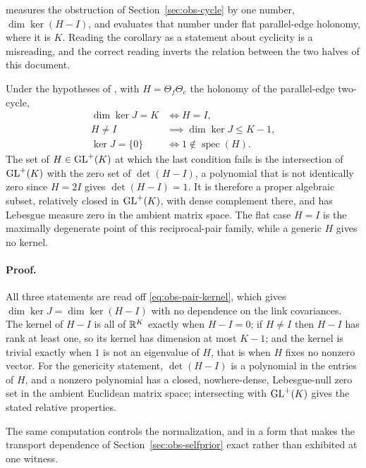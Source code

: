  measures the obstruction of Section~\ref{sec:obs-cycle} by one number, $\dim\ker(H-I)$, and  evaluates that number under flat parallel-edge holonomy, where it is $K$. Reading the corollary as a statement about cyclicity is a misreading, and the correct reading inverts the relation between the two halves of this document.

Under the hypotheses of , with
\(H=\Theta_f\Theta_e\) the holonomy of the parallel-edge two-cycle,
\begin{equation}
\begin{aligned}
\dim\ker J=K
&\iff H=I,\\
H\neq I
&\implies \dim\ker J\leq K-1,\\
\ker J=\{0\}
&\iff 1\notin\operatorname{spec}(H).
\end{aligned}
\label{eq:obs-holonomy-kernel}
\end{equation}
The set of $H\in\mathrm{GL}^{+}(K)$ at which the last condition fails is the intersection of \(\mathrm{GL}^+(K)\) with the zero set of $\det(H-I)$, a polynomial that is not identically zero since $H=2I$ gives $\det(H-I)=1$. It is therefore a proper algebraic subset, relatively closed in \(\mathrm{GL}^+(K)\), with dense complement there, and has Lebesgue measure zero in the ambient matrix space. The flat case $H=I$ is the maximally degenerate point of this reciprocal-pair family, while a generic \(H\) gives no kernel.

\paragraph{Proof.}
All three statements are read off \eqref{eq:obs-pair-kernel}, which gives $\dim\ker J=\dim\ker(H-I)$ with no dependence on the link covariances. The kernel of $H-I$ is all of $\mathbb R^{K}$ exactly when $H-I=0$; if $H\neq I$ then $H-I$ has rank at least one, so its kernel has dimension at most $K-1$; and the kernel is trivial exactly when $1$ is not an eigenvalue of $H$, that is when $H$ fixes no nonzero vector. For the genericity statement, $\det(H-I)$ is a polynomial in the entries of $H$, and a nonzero polynomial has a closed, nowhere-dense, Lebesgue-null zero set in the ambient Euclidean matrix space; intersecting with \(\mathrm{GL}^+(K)\) gives the stated relative properties.

The same computation controls the normalization, and in a form that makes the transport dependence of Section~\ref{sec:obs-selfprior} exact rather than exhibited at one witness.

